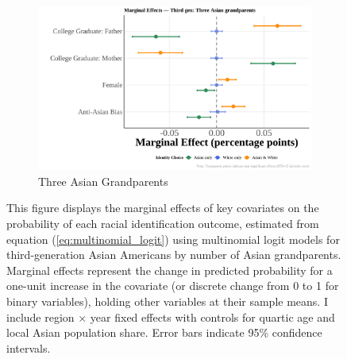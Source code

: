 \begin{center}
\begin{figure}[!htb]
\begin{subfigure}{.45\textwidth}
\caption{Three Asian Grandparents}\label{subfig:threeasiangrand}
\centering
\includegraphics[width=1\linewidth]{optimized_marginal_effects_third_three.png}
\end{subfigure}
\caption*{\footnotesize{This figure displays the marginal effects of key covariates on the probability of each racial identification outcome, estimated from equation (\ref{eq:multinomial_logit}) using multinomial logit models for third-generation Asian Americans by number of Asian grandparents. Marginal effects represent the change in predicted probability for a one-unit increase in the covariate (or discrete change from 0 to 1 for binary variables), holding other variables at their sample means. I include region $\times$ year fixed effects with controls for quartic age and local Asian population share. Error bars indicate 95\% confidence intervals.}}
\end{figure}
\end{center}


\pagebreak
\newpage



\pagebreak
\newpage



\pagebreak
\newpage


\pagebreak
\newpage

\clearpage
